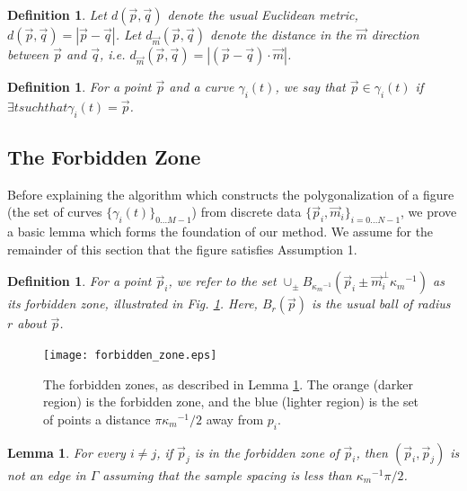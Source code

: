 \documentclass{article}
\newtheorem{definition}[cntr]{Definition}
\newtheorem{lemma}[cntr]{Lemma}
\numberwithin{cntr}{section}
\numberwithin{equation}{section}
\newcommand{\abs}[1]{\left| #1 \right|}%
\newcommand{\vp}[0]{{\vec{p}}}
\newcommand{\vq}[0]{{\vec{q}}}
\newcommand{\vm}[0]{{\vec{m}}}
\newcommand{\Oto}[1]{{0 \ldots #1-1}}
\newcommand{\OtoN}{{0 \ldots N-1}}
\newcommand{\allData}{{ \{ \vp_{i}, \vm_{i} \}_{i=\OtoN} }}
\newcommand{\curveSet}{{ \{ \gamma_i(t) \}_{\Oto{M}}}}
\newcommand{\poly}{{\Gamma}}
\newcommand{\ball}[2]{ { B_{#1}(#2) } }
\newcommand{\curvemax}{{\kappa_{m}}}
\newcommand{\curvemaxi}{{\curvemax^{-1}}}
\begin{document}
\begin{definition}
  \label{def:metric}
  Let $d(\vp,\vq)$ denote the usual Euclidean metric, $d(\vp,\vq) = \abs{\vp - \vq}$. Let $d_{\vm}(\vp,\vq)$ denote the distance in the $\vm$ direction between $\vp$ and $\vq$, i.e. $d_{\vm}(\vp,\vq) = \abs{ (\vp - \vq) \cdot \vm}$.
\end{definition}

\begin{definition}
  For a point $\vp$ and a curve $\gamma_{i}(t)$, we say that $\vp \in \gamma_{i}(t)$ if $\exists t such that \gamma_{i}(t)=\vp$.
\end{definition}

\subsection{The Forbidden Zone}

Before explaining the algorithm which constructs the polygonalization of
a figure (the set of curves $\curveSet$) from discrete data $\allData$, we
prove a basic lemma which forms the foundation of our method.
We assume for the remainder of this section that the figure
satisfies Assumption 1.

\begin{definition}
  For a point $\vp_{i}$, we refer to the set
$\cup_{\pm} \ball{\curvemaxi}{\vp_{i} \pm \vm_{i}^{\perp} \curvemaxi}$
as its \emph{forbidden zone},
illustrated in Fig. \ref{fig:forbiddenZone}.
Here, $\ball{r}{\vp}$ is the usual ball of radius $r$ about $\vp$.
\end{definition}

\begin{figure}
\setlength{\unitlength}{0.240900pt}
\ifx\plotpoint\undefined\newsavebox{\plotpoint}\fi
\sbox{\plotpoint}{\rule[-0.200pt]{0.400pt}{0.400pt}}%
\texttt{[image: forbidden\_zone.eps]}
\caption{The forbidden zones, as described in Lemma \ref{lem:forbiddenZone}.
The orange (darker region) is the forbidden zone, and the blue (lighter region)
is the set of points a distance $\pi \curvemaxi/2$ away from $p_{i}$.}
\label{fig:forbiddenZone}
\end{figure}

\begin{lemma}
\label{lem:forbiddenZone}
For every $i \neq j$, if $\vp_{j}$ is in the forbidden zone of $\vp_i$,
then $(\vp_{i},\vp_{j})$ is not an edge in $\poly$ assuming that the
sample spacing is less than $\curvemaxi \pi/2$.
\end{lemma}
\end{document}
